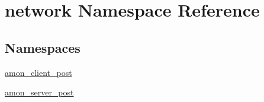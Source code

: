 \hypertarget{namespacenetwork}{\section{network Namespace Reference}
\label{namespacenetwork}
}
\subsection*{Namespaces}
\begin{DoxyCompactItemize}
\item 
\hyperlink{namespacenetwork_1_1amon__client__post}{amon\-\_\-client\-\_\-post}
\item 
\hyperlink{namespacenetwork_1_1amon__server__post}{amon\-\_\-server\-\_\-post}
\end{DoxyCompactItemize}

